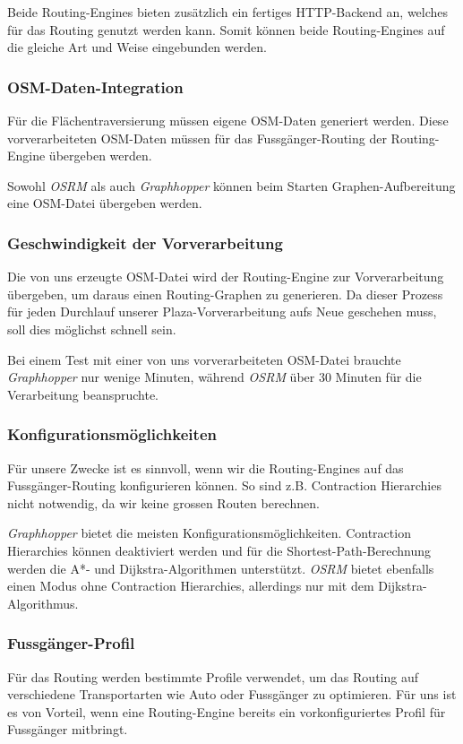Beide Routing-Engines bieten zusätzlich ein fertiges HTTP-Backend an, welches für das Routing genutzt werden kann. Somit können beide Routing-Engines auf die gleiche Art und Weise eingebunden werden.

\subsubsection{OSM-Daten-Integration}
\label{analyse:OSM-Daten-Integration}
Für die Flächentraversierung müssen eigene \ac{OSM}-Daten generiert werden. Diese vorverarbeiteten \ac{OSM}-Daten müssen für das Fussgänger-Routing der Routing-Engine übergeben werden.

Sowohl \emph{OSRM} als auch \emph{Graphhopper} können beim Starten Graphen-Aufbereitung eine \ac{OSM}-Datei übergeben werden.

\subsubsection{Geschwindigkeit der Vorverarbeitung}
\label{analyse:Geschwindigkeit der Vorverarbeitung}
Die von uns erzeugte \ac{OSM}-Datei wird der Routing-Engine zur Vorverarbeitung übergeben, um daraus einen Routing-Graphen zu generieren. Da dieser Prozess für jeden Durchlauf unserer Plaza-Vorverarbeitung aufs Neue geschehen muss, soll dies möglichst schnell sein.

Bei einem Test mit einer von uns vorverarbeiteten OSM-Datei brauchte \emph{Graphhopper} nur wenige Minuten, während \emph{OSRM} über 30 Minuten für die Verarbeitung beanspruchte.

\subsubsection{Konfigurationsmöglichkeiten}
\label{analyse:Konfigurationsmöglichkeiten}
Für unsere Zwecke ist es sinnvoll, wenn wir die Routing-Engines auf das Fussgänger-Routing konfigurieren können. So sind z.B. Contraction Hierarchies nicht notwendig, da wir keine grossen Routen berechnen.

\emph{Graphhopper} bietet die meisten Konfigurationsmöglichkeiten. Contraction Hierarchies können deaktiviert werden und für die Shortest-Path-Berechnung werden die A*- und Dijkstra-Algorithmen \cite{astar} \cite{dijkstra_algorithm} unterstützt. \emph{OSRM} bietet ebenfalls einen Modus ohne Contraction Hierarchies, allerdings nur mit dem Dijkstra-Algorithmus.

\subsubsection{Fussgänger-Profil}
\label{analyse:Fussgänger-Profil}
Für das Routing werden bestimmte Profile verwendet, um das Routing auf verschiedene Transportarten wie Auto oder Fussgänger zu optimieren. Für uns ist es von Vorteil, wenn eine Routing-Engine bereits ein vorkonfiguriertes Profil für Fussgänger mitbringt.

